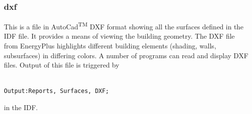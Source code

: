 \subsubsection{dxf}\label{dxf}

This is a file in AutoCad\textsuperscript{TM} DXF format showing all the surfaces defined in the IDF file. It provides a means of viewing the building geometry. The DXF file from EnergyPlus highlights different building elements (shading, walls, subsurfaces) in differing colors. A number of programs can read and display DXF files. Output of this file is triggered by

\begin{lstlisting}

Output:Reports, Surfaces, DXF;
\end{lstlisting}

in the IDF.
